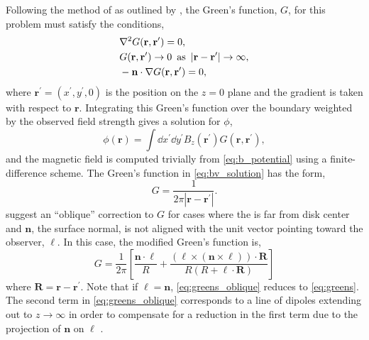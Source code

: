Following the method of \citet{schmidt_observable_1964} as outlined by \citet{sakurai_greens_1982}, the Green's function, $G$, for this problem must satisfy the conditions,
\begin{align}
    &\nabla^2G(\mathbf{r},\mathbf{r}^\prime) = 0, \nonumber \\
    &G(\mathbf{r},\mathbf{r}^\prime) \to 0 \enspace \textup{as} \enspace |\mathbf{r}-\mathbf{r}^\prime|\to\infty, \nonumber \\
    &-\mathbf{n}\cdot\nabla G(\mathbf{r},\mathbf{r}^\prime) = 0, \nonumber
\end{align} 
where $\mathbf{r}^\prime=(x^\prime,y^\prime,0)$ is the position on the $z=0$ plane and the gradient is taken with respect to $\mathbf{r}$. Integrating this Green's function over the boundary weighted by the observed field strength gives a solution for $\phi$,
\begin{equation}\label{eq:bv_solution}
    \phi(\mathbf{r}) = \int\dd{x^\prime}\dd{y^\prime}B_z(\mathbf{r}^\prime)G(\mathbf{r},\mathbf{r}^\prime),
\end{equation}
and the magnetic field is computed trivially from \autoref{eq:b_potential} using a finite-difference scheme. The Green's function in \autoref{eq:bv_solution} has the form,
\begin{equation}\label{eq:greens}
    G = \frac{1}{2\pi|\mathbf{r} - \mathbf{r}^\prime|}.
\end{equation}
\citet{schmidt_observable_1964} suggest an ``oblique'' correction to $G$ for cases where the \AR{} is far from disk center and $\mathbf{n}$, the surface normal, is not aligned with the unit vector pointing toward the observer, $\bm{\ell}$. In this case, the modified Green's function is,
\begin{equation}\label{eq:greens_oblique}
    G = \frac{1}{2\pi}\left[\frac{\mathbf{n}\cdot\bm{\ell}}{R} + \frac{(\bm{\ell}\times(\mathbf{n}\times\bm{\ell}))\cdot\mathbf{R}}{R(R + \bm{\ell}\cdot\mathbf{R})} \right]
\end{equation}
where $\mathbf{R}=\mathbf{r} - \mathbf{r}^\prime$. Note that if $\bm{\ell}=\mathbf{n}$, \autoref{eq:greens_oblique} reduces to \autoref{eq:greens}. The second term in \autoref{eq:greens_oblique} corresponds to a line of dipoles extending out to $z\to\infty$ in order to compensate for a reduction in the first term due to the projection of $\mathbf{n}$ on $\bm{\ell}$ \citep{sakurai_greens_1982}.

